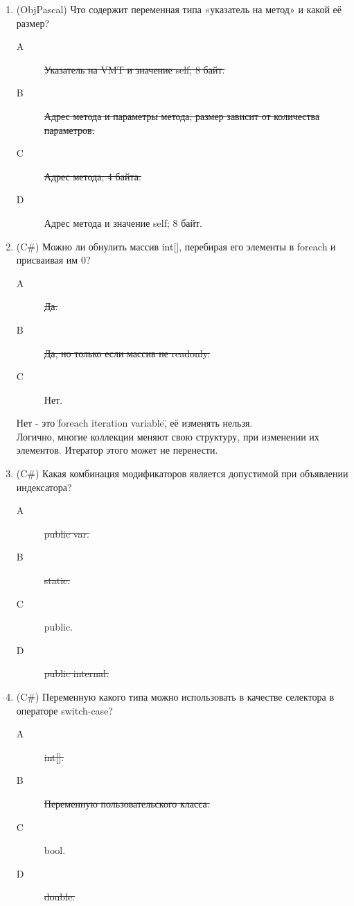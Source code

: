 \documentclass[12pt]{article}
\begin{document}
\begin{enumerate}
		\item (ObjPascal)  Что содержит переменная типа «указатель на метод» и какой её размер?
			\begin{description}
				\item[A] \sout{Указатель на VMT и значение self; 8 байт.}
				\item[B] \sout{Адрес метода и параметры метода; размер зависит от количества параметров.}
				\item[C] \sout{Адрес метода; 4 байта.}
				\item[D] Адрес метода и значение self; 8 байт.
			\end{description}

		\item (C\#) Можно ли обнулить массив int[], перебирая его элементы в foreach и присваивая им 0? 
			\begin{description}
				\item[A] \sout{Да.} 
				\item[B] \sout{Да, но только если массив не readonly.}
				\item[C] Нет.
			\end{description}

			Нет - это \"foreach iteration variable\", её изменять нельзя.
			\\
			Логично, многие коллекции меняют свою структуру, при изменении их элементов. Итератор этого может не перенести.

		\item (C\#) Какая комбинация модификаторов является допустимой при объявлении индексатора? 
			\begin{description}
				\item[A] \sout{public var.}
				\item[B] \sout{static.}
				\item[C] public.
				\item[D] \sout{public internal.}
			\end{description}

		\item (C\#) Переменную какого типа можно использовать в качестве селектора в операторе switch-case? 
			\begin{description}
				\item[A] \sout{int[].}
				\item[B] \sout{Переменную пользовательского класса.}
				\item[C] bool.
				\item[D] \sout{double.}
			\end{description}


	\end{enumerate}
\end{document}
